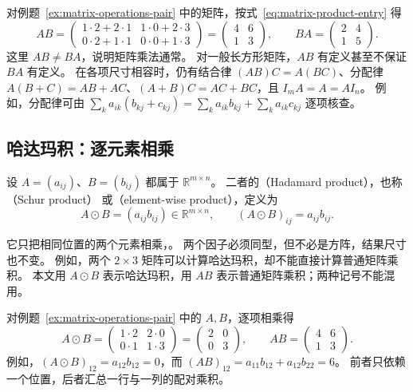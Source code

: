 \documentclass[UTF8,12pt,a4paper,fontset=fandol]{ctexart}
\begin{document}
对例题~\ref{ex:matrix-operations-pair} 中的矩阵，按式~\eqref{eq:matrix-product-entry} 得
\[
  AB=\begin{pmatrix}1\cdot2+2\cdot1&1\cdot0+2\cdot3\\
                     0\cdot2+1\cdot1&0\cdot0+1\cdot3\end{pmatrix}
     =\begin{pmatrix}4&6\\1&3\end{pmatrix},\qquad
  BA=\begin{pmatrix}2&4\\1&5\end{pmatrix}.
\]
这里 $AB\ne BA$，说明矩阵乘法通常。
对一般长方形矩阵，$AB$ 有定义甚至不保证 $BA$ 有定义。
在各项尺寸相容时，仍有结合律 $(AB)C=A(BC)$、分配律
$A(B+C)=AB+AC$、$(A+B)C=AC+BC$，且 $I_mA=A=AI_n$。
例如，分配律可由 $\sum_k a_{ik}(b_{kj}+c_{kj})
=\sum_k a_{ik}b_{kj}+\sum_k a_{ik}c_{kj}$ 逐项核查。

\subsection{哈达玛积：逐元素相乘}
\label{subsec:matrix-hadamard-product}

\begin{definition}[哈达玛积]
设 $A=(a_{ij})$、$B=(b_{ij})$ 都属于 $\mathbb R^{m\times n}$。
二者的（Hadamard product），也称（Schur product）
或（element-wise product），定义为
\begin{equation}
  A\odot B=(a_{ij}b_{ij})\in\mathbb R^{m\times n},\qquad
  (A\odot B)_{ij}=a_{ij}b_{ij}.
  \label{eq:matrix-hadamard-product}
\end{equation}
\end{definition}

它只把相同位置的两个元素相乘，。
两个因子必须同型，但不必是方阵，结果尺寸也不变。
例如，两个 $2\times3$ 矩阵可以计算哈达玛积，却不能直接计算普通矩阵乘积。
本文用 $A\odot B$ 表示哈达玛积，用 $AB$ 表示普通矩阵乘积；两种记号不能混用。

\begin{example}[与普通矩阵乘积比较]
对例题~\ref{ex:matrix-operations-pair} 中的 $A,B$，逐项相乘得
\[
  A\odot B
  =\begin{pmatrix}1\cdot2&2\cdot0\\0\cdot1&1\cdot3\end{pmatrix}
  =\begin{pmatrix}2&0\\0&3\end{pmatrix},\qquad
  AB=\begin{pmatrix}4&6\\1&3\end{pmatrix}.
\]
例如，$(A\odot B)_{12}=a_{12}b_{12}=0$，而
$(AB)_{12}=a_{11}b_{12}+a_{12}b_{22}=6$。
前者只依赖一个位置，后者汇总一行与一列的配对乘积。
\end{example}
\end{document}
